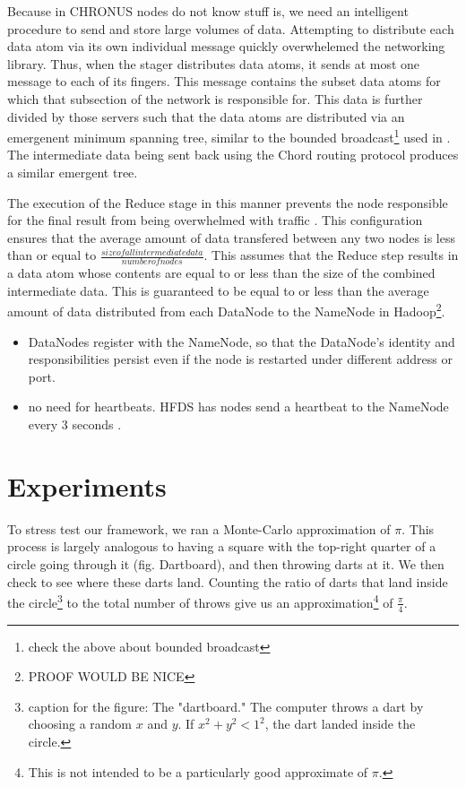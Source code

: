 \documentclass[conference, compsocconf, letterpaper]{IEEEtran}
\begin{document}
Because in CHRONUS nodes do not know stuff is, we need an intelligent procedure to send and store large volumes of data.  Attempting to distribute each data atom via its own individual message quickly overwhelemed the networking library. Thus, when the stager distributes data atoms, it sends at most one message to each of its fingers.  This message contains the subset data atoms for which that subsection of the network is responsible for.  This data is further divided by those servers such that the data atoms are distributed via an emergenent minimum spanning tree, similar to the bounded broadcast\footnote{check the above about bounded broadcast} used in \cite{leemap}.  The intermediate data being sent back using the Chord routing protocol produces a similar emergent tree. 

The execution of the Reduce stage in this manner prevents the node responsible for the final result from being overwhelmed with traffic \cite{hadoop-bottle}.  This configuration ensures that the average amount of data transfered between any two nodes is less than or equal to $\frac{size of all intermediate data}{number of nodes}$.  This assumes that the Reduce step results in a data atom whose contents are equal to or less than the size of the combined intermediate data.  This is guaranteed to be equal to or less than the average amount of data distributed from each DataNode to the NameNode in Hadoop\footnote{PROOF WOULD BE NICE}.

\begin{itemize}
    \item DataNodes register with the NameNode, so that the DataNode's identity and responsibilities persist even if the node is restarted under different address or port.
    \item no need for heartbeats.  HFDS has nodes send a heartbeat to the NameNode every 3 seconds \cite{shvachko2010hadoop}.  
\end{itemize}


\section{Experiments}
To stress test our framework, we ran a Monte-Carlo approximation of $\pi$. This process is largely analogous to having a square with the top-right quarter of a circle going through it (fig. Dartboard), and then throwing darts at it.  We then check to see where these darts land.  Counting the ratio of darts that land inside the circle\footnote{caption for the figure:  The "dartboard." The computer throws a dart by choosing a random $x$ and $y$.  If $x^{2} + y^{2} < 1^{2} $, the dart landed inside the circle.} to the total number of throws give us an approximation\footnote{This is not intended to be a particularly good approximate of $\pi$.} of $\frac{\pi}{4}$.
\end{document}
